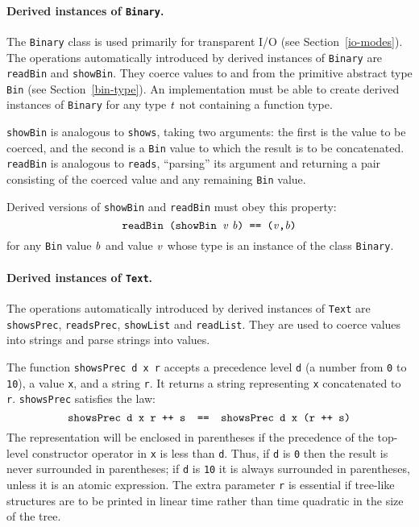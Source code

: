\paragraph*{Derived instances of \mbox{\tt Binary}.}
The \mbox{\tt Binary} class is used primarily for transparent I/O (see
Section~\ref{io-modes}).  The operations automatically introduced
by derived instances of \mbox{\tt Binary} are \mbox{\tt readBin} and
\mbox{\tt showBin}.  They coerce values to and
from the primitive abstract type \mbox{\tt Bin} (see Section~\ref{bin-type}).
An implementation must be able to create derived instances of \mbox{\tt Binary}
for any type \mbox{$\it t$} not containing a function type.

\mbox{\tt showBin} is analogous to \mbox{\tt shows}, taking two arguments: the first
is the value to be coerced, and the second is a \mbox{\tt Bin} value to which
the result is to be concatenated.  \mbox{\tt readBin} is analogous to \mbox{\tt reads},
``parsing'' its argument and returning a pair consisting of the
coerced value and any remaining \mbox{\tt Bin} value.  

Derived versions of \mbox{\tt showBin} and \mbox{\tt readBin} must obey this
property:
\[
\mbox{$\it \makebox{\tt readBin\ (showBin\ }v\ b\makebox{\tt )\ ==\ (}v\makebox{\tt ,}b\makebox{\tt )}$}
\]
for any \mbox{\tt Bin} value \mbox{$\it b$} and value \mbox{$\it v$} whose type is an instance of the
class \mbox{\tt Binary}.

\paragraph*{Derived instances of \mbox{\tt Text}.}
The operations automatically introduced by derived instances
of \mbox{\tt Text} are \mbox{\tt showsPrec}, \mbox{\tt readsPrec},
\mbox{\tt showList} and \mbox{\tt readList}.
They are used to coerce values into strings and parse strings into
values.

The function \mbox{\tt showsPrec\ d\ x\ r} accepts a precedence level \mbox{\tt d}
(a number from \mbox{\tt 0} to \mbox{\tt 10}), a value \mbox{\tt x}, and a string \mbox{\tt r}.
It returns a string representing \mbox{\tt x} concatenated to \mbox{\tt r}.
\mbox{\tt showsPrec} satisfies the law:
\[
\mbox{$\it \makebox{\tt showsPrec\ d\ x\ r\ ++\ s\ \ ==\ \ showsPrec\ d\ x\ (r\ ++\ s)}$}
\]
The representation will be enclosed in parentheses if the precedence
of the top-level constructor operator in \mbox{\tt x} is less than \mbox{\tt d}.  Thus,
if \mbox{\tt d} is \mbox{\tt 0} then the result is never surrounded in parentheses; if
\mbox{\tt d} is \mbox{\tt 10} it is always surrounded in parentheses, unless it is an
atomic expression.  The extra parameter \mbox{\tt r} is essential if tree-like
structures are to be printed in linear time rather than time quadratic
in the size of the tree.


